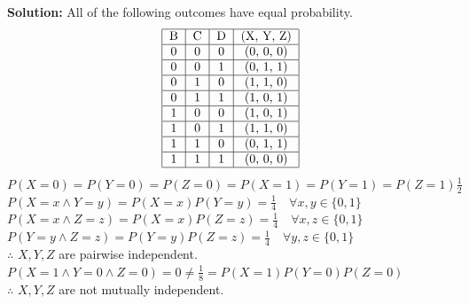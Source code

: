 \documentclass{article}
\newcommand{\solution}{\textbf{Solution: }}
\begin{document}
\begin{enumerate}[label=(\alph*)]
    \begin{mdframed} \solution All of the following outcomes have equal probability.
    \[
    \begin{tabular}{|c|c|c|c|}
    \hline
    B & C & D & (X, Y, Z)\\\hline
    0 & 0 & 0 & (0, 0, 0)\\\hline
    0 & 0 & 1 & (0, 1, 1)\\\hline
    0 & 1 & 0 & (1, 1, 0)\\\hline
    0 & 1 & 1 & (1, 0, 1)\\\hline
    1 & 0 & 0 & (1, 0, 1)\\\hline
    1 & 0 & 1 & (1, 1, 0)\\\hline
    1 & 1 & 0 & (0, 1, 1)\\\hline
    1 & 1 & 1 & (0, 0, 0)\\\hline
    \end{tabular}
    \]
    $P(X=0)=P(Y=0)=P(Z=0)=P(X=1)=P(Y=1)=P(Z=1)\frac{1}{2}$\\
    $P(X=x \wedge Y=y)=P(X=x)P(Y=y)=\frac{1}{4}\quad \forall x, y \in \{0, 1\}$\\
    $P(X=x \wedge Z=z)=P(X=x)P(Z=z)=\frac{1}{4}\quad \forall x, z \in \{0, 1\}$\\
    $P(Y=y \wedge Z=z)=P(Y=y)P(Z=z)=\frac{1}{4}\quad \forall y, z \in \{0, 1\}$\\
    $\therefore$ $X,Y,Z$ are pairwise independent.\\
    $P(X=1 \wedge Y=0 \wedge Z=0)=0 \neq \frac{1}{8}=P(X=1)P(Y=0)P(Z=0)$\\
    $\therefore$ $X,Y,Z$ are not mutually independent.
    \end{mdframed}
\end{enumerate}

\newpage
\end{document}
